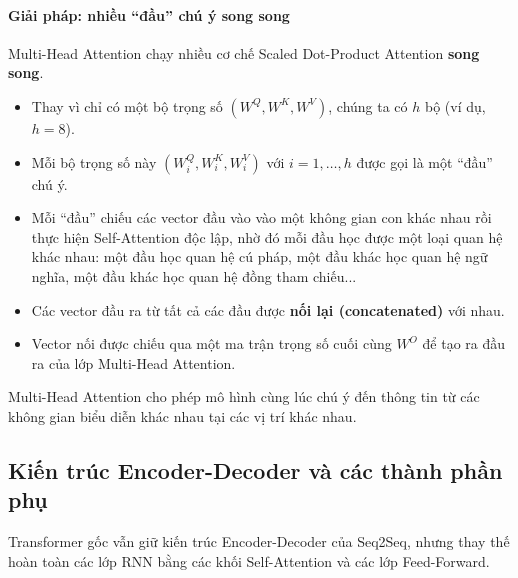 \paragraph{Giải pháp: nhiều “đầu” chú ý song song}
Multi-Head Attention chạy nhiều cơ chế Scaled Dot-Product Attention \textbf{song song}.
\begin{itemize}
    \item Thay vì chỉ có một bộ trọng số $(W^Q, W^K, W^V)$, chúng ta có $h$ bộ (ví dụ, $h=8$).
    \item Mỗi bộ trọng số này $(W^Q_i, W^K_i, W^V_i)$ với $i=1,\dots,h$ được gọi là một “đầu” chú ý.
    \item Mỗi “đầu” chiếu các vector đầu vào vào một không gian con khác nhau rồi thực hiện Self-Attention độc lập, nhờ đó mỗi đầu học được một loại quan hệ khác nhau: một đầu học quan hệ cú pháp, một đầu khác học quan hệ ngữ nghĩa, một đầu khác học quan hệ đồng tham chiếu...
    \item Các vector đầu ra từ tất cả các đầu được \textbf{nối lại (concatenated)} với nhau.
    \item Vector nối được chiếu qua một ma trận trọng số cuối cùng $W^O$ để tạo ra đầu ra của lớp Multi-Head Attention.
\end{itemize}

\begin{center}
    \label{fig:multi_head_attention}
\end{center}

Multi-Head Attention cho phép mô hình cùng lúc chú ý đến thông tin từ các không gian biểu diễn khác nhau tại các vị trí khác nhau.

\subsection{Kiến trúc Encoder-Decoder và các thành phần phụ}
\label{ssec:transformer_architecture}
Transformer gốc vẫn giữ kiến trúc Encoder-Decoder của Seq2Seq, nhưng thay thế hoàn toàn các lớp RNN bằng các khối Self-Attention và các lớp Feed-Forward.

